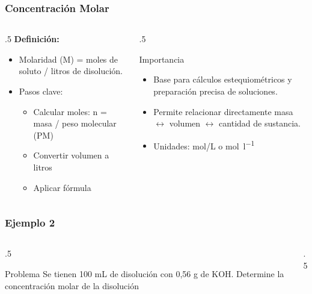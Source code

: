 \documentclass[11pt, aspectratio=169, xcolor=table]{beamer}
\begin{document}
\begin{frame}[allowdisplaybreaks]
	\frametitle{Concentración Molar}
	\begin{columns}
		\begin{column}{.5\textwidth}
			\textbf{Definición:}
			\begin{itemize}[<+->]
				\item Molaridad (M) = moles de soluto / litros de disolución.
				\item Pasos clave:
				      \begin{itemize}[<+->]
					      \item Calcular moles: n = masa / peso molecular (PM)
					      \item Convertir volumen a litros
					      \item Aplicar fórmula
				      \end{itemize}
			\end{itemize}
		\end{column}

		\begin{column}{.5\textwidth}
			\begin{block}{Importancia}
				\begin{itemize}[<+->]
					\item Base para cálculos estequiométricos y preparación precisa de soluciones.
					\item Permite relacionar directamente masa $\leftrightarrow$ volumen $\leftrightarrow$ cantidad de sustancia.
					\item Unidades: \unit{mol/L} o \unit{\mol\per\litre}
				\end{itemize}
			\end{block}
		\end{column}
	\end{columns}
\end{frame}

\begin{frame}[allowdisplaybreaks]
	\frametitle{Ejemplo 2}
	\begin{columns}
		\begin{column}{.5\textwidth}
			\begin{exampleblock}{Problema}
				Se tienen 100 mL de disolución con 0,56 g de KOH. Determine la concentración molar de la disolución
			\end{exampleblock}

		\end{column}

		\begin{column}{.5\textwidth}

		\end{column}
	\end{columns}
\end{frame}
\end{document}

